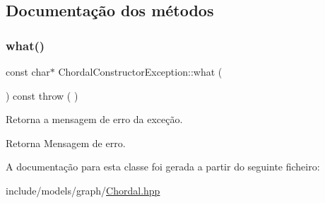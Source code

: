 \subsection{Documentação dos métodos}
\mbox{\label{classChordalConstructorException_af45168f68f01e0b7cd98d8e82306a49b}} 
\subsubsection{\texorpdfstring{what()}{what()}}
{\footnotesize\ttfamily const char$\ast$ Chordal\+Constructor\+Exception\+::what (\begin{DoxyParamCaption}{ }\end{DoxyParamCaption}) const throw ( ) \hspace{0.3cm}{\ttfamily [inline]}}

Retorna a mensagem de erro da exceção. \begin{DoxyReturn}{Retorna}
Mensagem de erro. 
\end{DoxyReturn}


A documentação para esta classe foi gerada a partir do seguinte ficheiro\+:\begin{DoxyCompactItemize}
\item 
include/models/graph/\mbox{\hyperlink{Chordal_8hpp}{Chordal.\+hpp}}\end{DoxyCompactItemize}
